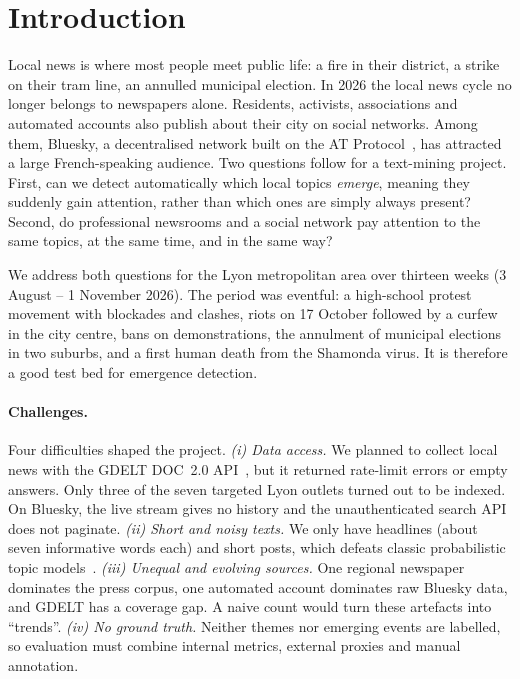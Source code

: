 \documentclass[pdflatex,sn-mathphys-num]{sn-jnl}
\begin{document}
\section{Introduction}\label{sec:intro}

Local news is where most people meet public life: a fire in their district, a strike on their tram line, an annulled municipal election. In 2026 the local news cycle no longer belongs to newspapers alone. Residents, activists, associations and automated accounts also publish about their city on social networks. Among them, Bluesky, a decentralised network built on the AT Protocol~\cite{kleppmann2024bluesky}, has attracted a large French-speaking audience. Two questions follow for a text-mining project. First, can we detect automatically which local topics \emph{emerge}, meaning they suddenly gain attention, rather than which ones are simply always present? Second, do professional newsrooms and a social network pay attention to the same topics, at the same time, and in the same way?

We address both questions for the Lyon metropolitan area over thirteen weeks (3 August -- 1 November 2026). The period was eventful: a high-school protest movement with blockades and clashes, riots on 17 October followed by a curfew in the city centre, bans on demonstrations, the annulment of municipal elections in two suburbs, and a first human death from the Shamonda virus. It is therefore a good test bed for emergence detection.

\paragraph{Challenges.} Four difficulties shaped the project. \emph{(i) Data access.} We planned to collect local news with the GDELT DOC~2.0 API~\cite{gdeltdoc2017}, but it returned rate-limit errors or empty answers. Only three of the seven targeted Lyon outlets turned out to be indexed. On Bluesky, the live stream gives no history and the unauthenticated search API does not paginate. \emph{(ii) Short and noisy texts.} We only have headlines (about seven informative words each) and short posts, which defeats classic probabilistic topic models~\cite{hong2010twitter,yan2013btm}. \emph{(iii) Unequal and evolving sources.} One regional newspaper dominates the press corpus, one automated account dominates raw Bluesky data, and GDELT has a coverage gap. A naive count would turn these artefacts into ``trends''. \emph{(iv) No ground truth.} Neither themes nor emerging events are labelled, so evaluation must combine internal metrics, external proxies and manual annotation.
\end{document}
